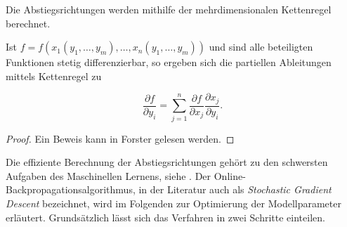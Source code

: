 Die Abstiegsrichtungen werden mithilfe der mehrdimensionalen Kettenregel  berechnet.
\begin{satz}
    \label{s:chainrule}
    Ist $f=f(x_1(y_1, \ldots, y_m), \ldots, x_n(y_1, \ldots, y_m))$ und sind alle beteiligten Funktionen stetig differenzierbar, so ergeben sich die partiellen Ableitungen mittels Kettenregel zu

    \begin{equation*}
        \frac{\partial f}{\partial y_i}=\sum_{j=1}^n \frac{\partial f}{\partial x_j} \frac{\partial x_j}{\partial y_i} .
    \end{equation*}
\end{satz}

\begin{proof}
    Ein Beweis kann in Forster \cite{forster2017analysis} gelesen werden.
\end{proof}
Die effiziente Berechnung der Abstiegsrichtungen gehört zu den schwersten Aufgaben des Maschinellen Lernens, siehe \cite{DBLP:series/lncs/LeCunBOM12}.
Der Online-Backpropagationsalgorithmus, in der Literatur auch als \textit{Stochastic Gradient Descent} bezeichnet, wird im Folgenden zur Optimierung der Modellparameter erläutert. Grundsätzlich lässt sich das Verfahren in zwei Schritte einteilen.

